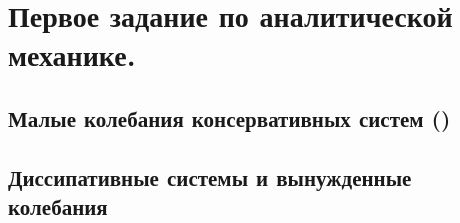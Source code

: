 



\section{Первое задание по аналитической механике.}


\subsection{Малые колебания консервативных систем \texorpdfstring{(\checkmark)}{(ок)}}


\newpage

\subsection{Диссипативные системы и вынужденные колебания}


